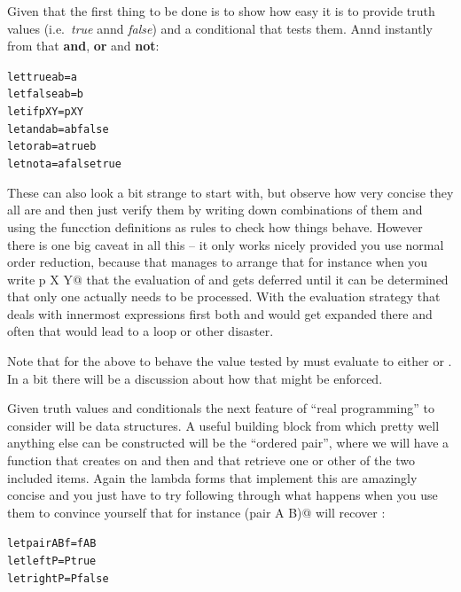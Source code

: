 Given that the first thing to be done is to show how easy it is to
provide truth values (i.e.\ {\em true} annd {\em false}) and a
conditional that tests them. Annd instantly from that {\bf and},
{\bf or} and {\bf not}:
\begin{alltt}
   let true a b = a
   let false a b = b
   let if p X Y = p X Y
   let and a b = a b false
   let or a b = a true b
   let not a = a false true
\end{alltt}
These can also look a bit strange to start with, but observe how very
concise they all are and then just verify them by writing down
combinations of them and using the funcction definitions as rules to
check how things behave. However there is one big caveat in all this --
it only works nicely provided you use normal order reduction, because
that manages to arrange that for instance when you write \verb@if p X Y@
that the evaluation of \verb@X@ and \verb@Y@ gets deferred until it can
be determined that only one actually needs to be processed. With
the evaluation strategy that deals with innermost expressions first
both \verb@X@ and \verb@Y@ would get expanded there and often that
would lead to a loop or other disaster.

Note that for the above to behave the value \verb@p@ tested by \verb@if@
must evaluate to either \verb@true@ or \verb@false@. In a bit there will
be a discussion about how that might be enforced.

Given truth values and conditionals the next feature of ``real programming''
to consider will be data structures.  A useful building block from which
pretty well anything else can be constructed will be the ``ordered pair'',
where we will have a function \verb@pair@ that creates on and then
\verb@left@ and \verb@right@ that retrieve one or other of the
two included items. Again the lambda forms that implement this are
amazingly concise and you just have to try following through what
happens when you use them to convince yourself that for instance
\verb@left (pair A B)@ will recover \verb@A@:
\begin{alltt}
   let pair A B f = f A B
   let left P = P true
   let right P = P false
\end{alltt}

